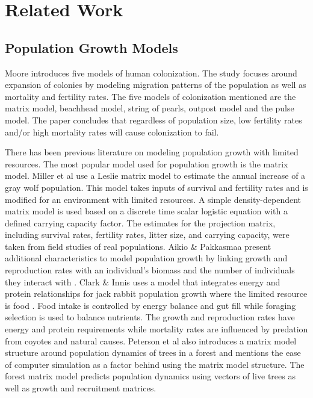 \documentclass[12pt]{article}
\begin{document}
\section{Related Work}
\label{sec:relatedwork}

\subsection{Population Growth Models}

Moore \cite{moore2001evaluating} introduces five models of human
colonization. The study focuses around expansion of colonies by modeling
migration patterns of the population as well as mortality and fertility rates.
The five models of colonization mentioned are the matrix model, beachhead
model, string of pearls, outpost model and the pulse model. The paper
concludes that regardless of population size, low fertility rates and/or high
mortality rates will cause colonization to fail.

There has been previous literature on modeling population growth with limited
resources. The most popular model used for population growth is the matrix
model.  Miller et al \cite{miller2002density} use a Leslie matrix
model to estimate the annual increase of a gray wolf population. This model
takes inputs of survival and fertility rates and is modified for an environment
with limited resources. A simple density-dependent matrix model is used based
on a discrete time scalar logistic equation with a defined carrying capacity
factor. The estimates for the projection matrix, including survival rates,
fertility rates, litter size, and carrying capacity, were taken from field
studies of real populations. Aikio \& Pakkasmaa present additional
characteristics to model population growth by linking growth and reproduction
rates with an individual's biomass and the number of individuals they
interact with \cite{aikio2003relatedness}. Clark \& Innis uses a model that
integrates energy and protein relationships for jack rabbit population growth
where the limited resource is food \cite{clark1982forage}. Food intake is
controlled by energy balance and gut fill while foraging selection is used to
balance nutrients. The growth and reproduction rates have energy and protein
requirements while mortality rates are influenced by predation from coyotes and
natural causes.  Peterson et al \cite{peterson2014modeling} also introduces a
matrix model structure around population dynamics of trees in a forest and
mentions the ease of computer simulation as a factor behind using the matrix
model structure. The forest matrix model predicts population dynamics using
vectors of live trees as well as growth and recruitment matrices.
\end{document}
